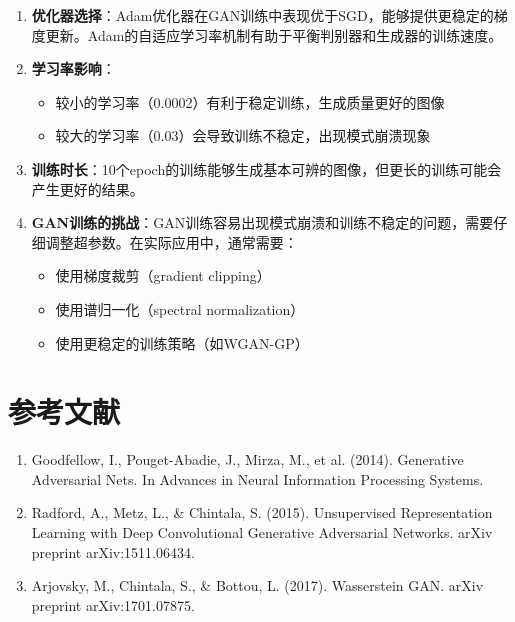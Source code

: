 \documentclass[a4paper]{article}
\begin{document}
\begin{enumerate}
    \item \textbf{优化器选择}：Adam优化器在GAN训练中表现优于SGD，能够提供更稳定的梯度更新。Adam的自适应学习率机制有助于平衡判别器和生成器的训练速度。

    \item \textbf{学习率影响}：
    \begin{itemize}
        \item 较小的学习率（0.0002）有利于稳定训练，生成质量更好的图像
        \item 较大的学习率（0.03）会导致训练不稳定，出现模式崩溃现象
    \end{itemize}

    \item \textbf{训练时长}：10个epoch的训练能够生成基本可辨的图像，但更长的训练可能会产生更好的结果。

    \item \textbf{GAN训练的挑战}：GAN训练容易出现模式崩溃和训练不稳定的问题，需要仔细调整超参数。在实际应用中，通常需要：
    \begin{itemize}
        \item 使用梯度裁剪（gradient clipping）
        \item 使用谱归一化（spectral normalization）
        \item 使用更稳定的训练策略（如WGAN-GP）
    \end{itemize}
\end{enumerate}

\section{参考文献}

\begin{enumerate}
    \item Goodfellow, I., Pouget-Abadie, J., Mirza, M., et al. (2014). Generative Adversarial Nets. In Advances in Neural Information Processing Systems.
    \item Radford, A., Metz, L., & Chintala, S. (2015). Unsupervised Representation Learning with Deep Convolutional Generative Adversarial Networks. arXiv preprint arXiv:1511.06434.
    \item Arjovsky, M., Chintala, S., & Bottou, L. (2017). Wasserstein GAN. arXiv preprint arXiv:1701.07875.
\end{enumerate}
\end{document}
